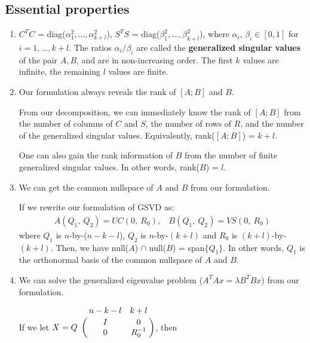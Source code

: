     \subsection{Essential properties} \label{properties}
        \begin{enumerate}
         \item $C^T C $ = diag($\alpha_1^{2}, ..., \alpha_{k+l}^{2}$), $S^T S$ = diag($\beta_1^{2}, ..., \beta_{k+l}^{2}$), where $\alpha_i$, $\beta_i \in [0, 1]$ for $i = 1,..., k+l$. The ratios $\alpha_i/\beta_i$ are called the \textbf{generalized singular values} of the pair $A, B$, and are in non-increasing order. The first $k$ values are infinite, the remaining $l$ values are finite.
         
         \item Our formulation always reveals the rank of $[A; B]$ and $B$.
         
             From our decomposition, we can immediately know the rank of $[A; B]$ from the number of columns of $C$ and $S$, the number of rows of $R$, and the number of the generalized singular values. Equivalently, rank($[A; B]$) = $k+l$.
             
            One can also gain the rank information of $B$ from the number of finite generalized singular values. In other words, rank($B$) = $l$.
         
         \item We can get the common nullspace of $A$ and $B$ from our formulation.
         
             If we rewrite our formulation of GSVD as:
             \begin{align}
                 A(Q_1, \ Q_2) = UC(0, \ R_0),\ \ \ \ B(Q_1, \ Q_2) = VS(0, \ R_0)
             \end{align}
             where $Q_1$ is $n$-by-($n-k-l$), $Q_2$ is $n$-by-$(k+l)$ and $R_0$ is $(k+l)$-by-$(k+l)$. Then, we have null($A$) $\cap$ null($B$) = span$\{Q_1\}$. In other words, $Q_1$ is the orthonormal basis of the common nullspace of $A$ and $B$.
         
         \item We can solve the generalized eigenvalue problem ($A^TAx = \lambda B^TBx$) from our formulation.
            
            If we let $X = Q\bordermatrix{ & n-k-l & k+l   \cr
                                    \hfill & I & 0 \cr
                                    \hfill & 0 & R_0^{-1} }$, then
            

\end{enumerate}

